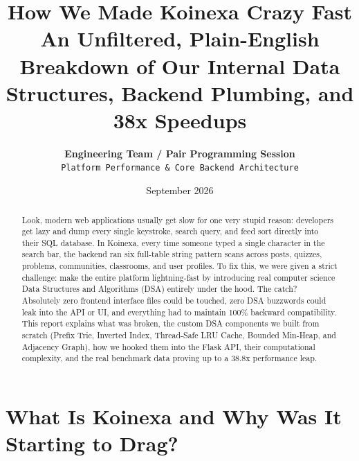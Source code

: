\documentclass[11pt,a4paper]{article}
\title{\textbf{\Huge How We Made Koinexa Crazy Fast}\\[0.4cm]
\Large An Unfiltered, Plain-English Breakdown of Our Internal Data Structures, Backend Plumbing, and 38x Speedups}
\author{\textbf{Engineering Team / Pair Programming Session} \\ \texttt{Platform Performance \& Core Backend Architecture}}
\date{September 2026}
\begin{document}
\maketitle

\begin{abstract}
Look, modern web applications usually get slow for one very stupid reason: developers get lazy and dump every single keystroke, search query, and feed sort directly into their SQL database. In Koinexa, every time someone typed a single character in the search bar, the backend ran six full-table string pattern scans across posts, quizzes, problems, communities, classrooms, and user profiles. To fix this, we were given a strict challenge: make the entire platform lightning-fast by introducing real computer science Data Structures and Algorithms (DSA) entirely under the hood. The catch? Absolutely zero frontend interface files could be touched, zero DSA buzzwords could leak into the API or UI, and everything had to maintain 100\% backward compatibility. This report explains what was broken, the custom DSA components we built from scratch (Prefix Trie, Inverted Index, Thread-Safe LRU Cache, Bounded Min-Heap, and Adjacency Graph), how we hooked them into the Flask API, their computational complexity, and the real benchmark data proving up to a 38.8x performance leap.
\end{abstract}

\vspace{0.5cm}
\tableofcontents
\newpage

\section{What Is Koinexa and Why Was It Starting to Drag?}
\end{document}
